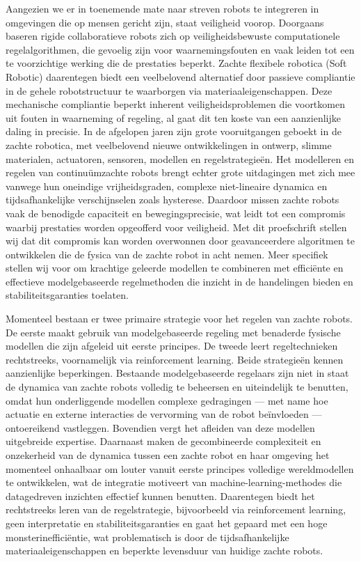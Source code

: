 {
Aangezien we er in toenemende mate naar streven robots te integreren in omgevingen die op mensen gericht zijn, staat veiligheid voorop. Doorgaans baseren rigide collaboratieve robots zich op veiligheidsbewuste computationele regelalgorithmen, die gevoelig zijn voor waarnemingsfouten en vaak leiden tot een te voorzichtige werking die de prestaties beperkt. Zachte flexibele robotica (Soft Robotic) daarentegen biedt een veelbelovend alternatief door passieve compliantie in de gehele robotstructuur te waarborgen via materiaaleigenschappen. Deze mechanische compliantie beperkt inherent veiligheidsproblemen die voortkomen uit fouten in waarneming of regeling, al gaat dit ten koste van een aanzienlijke daling in precisie. In de afgelopen jaren zijn grote vooruitgangen geboekt in de zachte robotica, met veelbelovend nieuwe ontwikkelingen in ontwerp, slimme materialen, actuatoren, sensoren, modellen en regelstrategieën. Het modelleren en regelen van continuümzachte robots brengt echter grote uitdagingen met zich mee vanwege hun oneindige vrijheidsgraden, complexe niet-lineaire dynamica en tijdsafhankelijke verschijnselen zoals hysterese. Daardoor missen zachte robots vaak de benodigde capaciteit en bewegingsprecisie, wat leidt tot een compromis waarbij prestaties worden opgeofferd voor veiligheid. Met dit proefschrift stellen wij dat dit compromis kan worden overwonnen door geavanceerdere algoritmen te ontwikkelen die de fysica van de zachte robot in acht nemen. Meer specifiek stellen wij voor om krachtige geleerde modellen te combineren met efficiënte en effectieve modelgebaseerde regelmethoden die inzicht in de handelingen bieden en stabiliteitsgaranties toelaten.

Momenteel bestaan er twee primaire strategie voor het regelen van zachte robots. De eerste maakt gebruik van modelgebaseerde regeling met benaderde fysische modellen die zijn afgeleid uit eerste principes. De tweede leert regeltechnieken rechtstreeks, voornamelijk via reinforcement learning. Beide strategieën kennen aanzienlijke beperkingen. Bestaande modelgebaseerde regelaars zijn niet in staat de dynamica van zachte robots volledig te beheersen en uiteindelijk te benutten, omdat hun onderliggende modellen complexe gedragingen — met name hoe actuatie en externe interacties de vervorming van de robot beïnvloeden — ontoereikend vastleggen. Bovendien vergt het afleiden van deze modellen uitgebreide expertise. Daarnaast maken de gecombineerde complexiteit en onzekerheid van de dynamica tussen een zachte robot en haar omgeving het momenteel onhaalbaar om louter vanuit eerste principes volledige wereldmodellen te ontwikkelen, wat de integratie motiveert van machine-learning-methodes die datagedreven inzichten effectief kunnen benutten. Daarentegen biedt het rechtstreeks leren van de regelstrategie, bijvoorbeeld via reinforcement learning, geen interpretatie en stabiliteitsgaranties en gaat het gepaard met een hoge monsterinefficiëntie, wat problematisch is door de tijdsafhankelijke materiaaleigenschappen en beperkte levensduur van huidige zachte robots.

}

